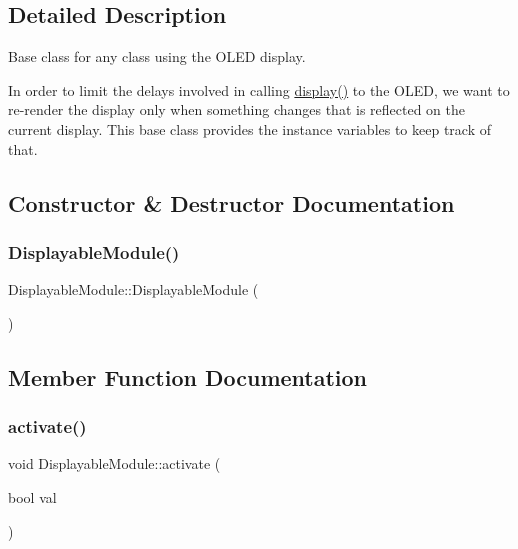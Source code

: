 \subsection{Detailed Description}
Base class for any class using the O\+L\+ED display. 

In order to limit the delays involved in calling \mbox{\hyperlink{class_displayable_module_a02de26d62ef508cae9ed07920e21784d}{display()}} to the O\+L\+ED, we want to re-\/render the display only when something changes that is reflected on the current display. This base class provides the instance variables to keep track of that. 

\subsection{Constructor \& Destructor Documentation}
\mbox{\label{class_displayable_module_a2495c334435664dba66160a00193ca7f}} 
\subsubsection{\texorpdfstring{Displayable\+Module()}{DisplayableModule()}}
{\footnotesize\ttfamily Displayable\+Module\+::\+Displayable\+Module (\begin{DoxyParamCaption}{ }\end{DoxyParamCaption})}



\subsection{Member Function Documentation}
\mbox{\label{class_displayable_module_a829fc6e70ddf9286a0772e3c1d173e7e}} 
\subsubsection{\texorpdfstring{activate()}{activate()}}
{\footnotesize\ttfamily void Displayable\+Module\+::activate (\begin{DoxyParamCaption}\item[{bool}]{val }\end{DoxyParamCaption})}

